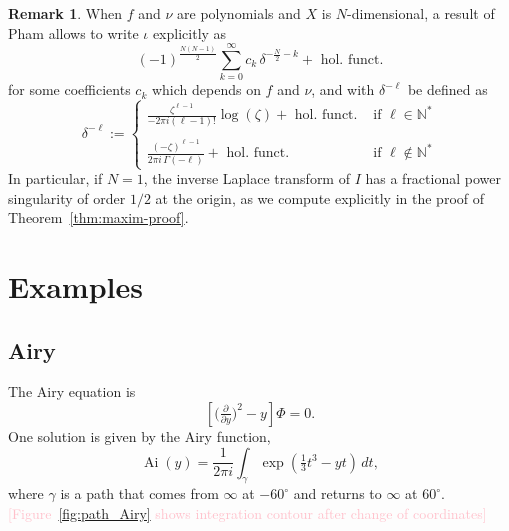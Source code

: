\documentclass{article}
\DeclareMathOperator{\Ai}{Ai}
\theoremstyle{definition}
\newtheorem{remark}[definition]{Remark}
\theoremstyle{plain}
\begin{document}
\begin{remark}\label{rmk:Pham formula}
    When $f$ and $\nu$ are polynomials and $X$ is $N$-dimensional, a result of Pham \cite[Equation 2.4, II partie]{pham} allows to write ${\iota}$ explicitly as 
    \begin{equation}\label{eqn:Pham}
        (-1)^{\frac{N(N-1)}{2}}  \sum_{k=0}^\infty c_k\, \delta^{-\frac{N}{2}-k}+ \text{ hol. funct.}
    \end{equation}
    for some coefficients $c_k$ which depends on $f$ and $\nu$, and with $\delta^{-\ell}$ be defined as
   \begin{equation*}
       \delta^{-\ell}:=\begin{cases}
           \frac{\zeta^{\ell-1}}{-2\pi i(\ell-1)!}\log(\zeta) + \text{ hol. funct.} & \text{ if } \ell\in\mathbb{N}^*\\
           & \\
           \frac{(-\zeta)^{\ell-1}}{2\pi i\, \Gamma(-\ell)}+ \text{ hol. funct.} & \text{ if } \ell\notin \mathbb{N}^* 
       \end{cases}
   \end{equation*}
In particular, if $N=1$, the inverse Laplace transform of $I$ has a fractional power singularity of order $1/2$ at the origin, as we compute explicitly in the proof of Theorem~\ref{thm:maxim-proof}. %
\end{remark}
\section{Examples}\label{sec:examples}

\subsection{Airy}

The Airy equation is
\begin{equation}\label{eqn:airy}
\left[\big(\tfrac{\partial}{\partial y}\big)^2 - y\right] \Phi = 0.
\end{equation}
One solution is given by the Airy function,
\[ \Ai(y) = \frac{1}{2\pi i} \int_\gamma \exp\left(\tfrac{1}{3}t^3 - yt\right)\,dt, \]
where $\gamma$ is a path that comes from $\infty$ at $-60^\circ$ and returns to $\infty$ at $60^\circ$. \textcolor{Pink}{[Figure~\ref{fig:path_Airy} shows integration contour after change of coordinates]}
\end{document}
